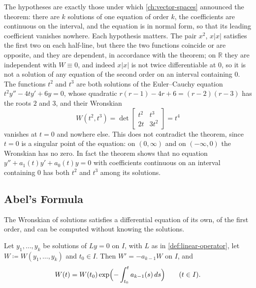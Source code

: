 The hypotheses are exactly those under which \cref{ch:vector-spaces} announced the theorem: there are $k$ solutions of one equation of order $k$, the coefficients are continuous on the interval, and the equation is in normal form, so that its leading coefficient vanishes nowhere. Each hypothesis matters. The pair $x^2$, $x|x|$ satisfies the first two on each half-line, but there the two functions coincide or are opposite, and they are dependent, in accordance with the theorem; on $\mathbb R$ they are independent with $W\equiv0$, and indeed $x|x|$ is not twice differentiable at $0$, so it is not a solution of any equation of the second order on an interval containing $0$. The functions $t^2$ and $t^3$ are both solutions of the Euler--Cauchy equation $t^2y''-4ty'+6y=0$, whose quadratic $r(r-1)-4r+6=(r-2)(r-3)$ has the roots $2$ and $3$, and their Wronskian
\[
W(t^2,t^3)=\det\begin{bmatrix}t^2&t^3\\2t&3t^2\end{bmatrix}=t^4
\]
vanishes at $t=0$ and nowhere else. This does not contradict the theorem, since $t=0$ is a singular point of the equation: on $(0,\infty)$ and on $(-\infty,0)$ the Wronskian has no zero. In fact the theorem shows that no equation $y''+a_1(t)y'+a_0(t)y=0$ with coefficients continuous on an interval containing $0$ has both $t^2$ and $t^3$ among its solutions.

\subsection{Abel's Formula}

The Wronskian of solutions satisfies a differential equation of its own, of the first order, and can be computed without knowing the solutions.

\begin{theorem}
\label{thm:abel}
Let $y_1,\ldots,y_k$ be solutions of $Ly=0$ on $I$, with $L$ as in \cref{def:linear-operator}, let $W\coloneqq W(y_1,\ldots,y_k)$ and $t_0\in I$. Then $W'=-a_{k-1}W$ on $I$, and
\[
W(t)=W(t_0)\exp\Bigl(-\int_{t_0}^ta_{k-1}(s)\,ds\Bigr)\qquad(t\in I).
\]
\end{theorem}

